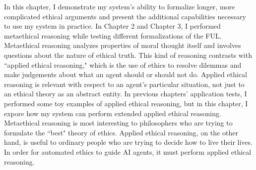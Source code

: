 %
\begin{isabellebody}%
%
%
\isadelimtheory
%
\endisadelimtheory
%
\isatagtheory
%
\endisatagtheory
{\isafoldtheory}%
%
\isadelimtheory
%
\endisadelimtheory
%
\isadelimdocument
%
\endisadelimdocument
%
\isatagdocument
%
\isamarkuptrue%
%
\endisatagdocument
{\isafolddocument}%
%
\isadelimdocument
%
\endisadelimdocument
%
\begin{isamarkuptext}%
In this chapter, I 
demonstrate my system's ability to formalize longer, more complicated ethical arguments and present 
the additional capabilities necessary to use my system in practice. In Chapter 2
and Chapter 3, I performed metaethical reasoning while testing different formalizations of the FUL. Metaethical
reasoning analyzes properties of moral thought itself and involves questions about the nature of ethical
truth. This kind of reasoning contrasts with ``applied 
ethical reasoning," which is the use of ethics to resolve dilemmas and make judgements about 
what an agent should or should not do. Applied ethical reasoning is relevant with respect to an agent's
particular situation, not just to an ethical theory as an abstract entity. In previous chapters' application tests,
I performed some toy examples of applied ethical reasoning, but in this chapter, I expore how my system can 
perform extended applied ethical reasoning. Metaethical reasoning is most interesting to philosophers 
who are trying to formulate the ``best" theory of ethics. Applied ethical reasoning, on the other hand, 
is useful to ordinary people who are trying to decide how to live their lives. In order for automated 
ethics to guide AI agents, it must perform applied ethical reasoning. 


\end{isamarkuptext}
\end{isabellebody}
